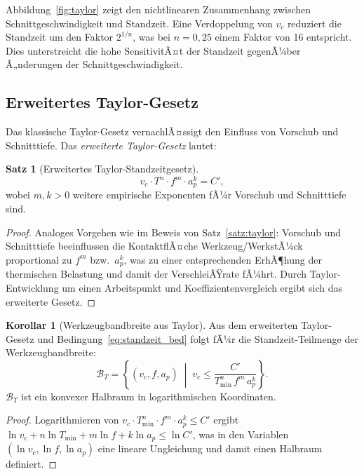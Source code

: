 ﻿\documentclass[a4paper,12pt]{article}
\theoremstyle{definition}
\newtheorem{satz}{Satz}
\newtheorem{korollar}{Korollar}
\begin{document}
Abbildung~\ref{fig:taylor} zeigt den nichtlinearen Zusammenhang zwischen
Schnittgeschwindigkeit und Standzeit. Eine Verdoppelung von $v_c$ reduziert die
Standzeit um den Faktor $2^{1/n}$, was bei $n = 0{,}25$ einem Faktor von 16
entspricht. Dies unterstreicht die hohe SensitivitÃ¤t der Standzeit gegenÃ¼ber
Ã„nderungen der Schnittgeschwindigkeit.

\subsection{Erweitertes Taylor-Gesetz}

Das klassische Taylor-Gesetz vernachlÃ¤ssigt den Einfluss von Vorschub und
Schnitttiefe. Das \emph{erweiterte Taylor-Gesetz} lautet:

\begin{satz}[Erweitertes Taylor-Standzeitgesetz]
\label{satz:taylor_erweitert}
  \[
    v_c \cdot T^n \cdot f^m \cdot a_p^k = C',
  \]
  wobei $m, k > 0$ weitere empirische Exponenten fÃ¼r Vorschub und Schnitttiefe sind.
\end{satz}

\begin{proof}
  Analoges Vorgehen wie im Beweis von Satz~\ref{satz:taylor}: Vorschub und
  Schnitttiefe beeinflussen die KontaktflÃ¤che Werkzeug/WerkstÃ¼ck proportional zu
  $f^{m}$ bzw.\ $a_p^{k}$, was zu einer entsprechenden ErhÃ¶hung der thermischen
  Belastung und damit der VerschleiÃŸrate fÃ¼hrt. Durch Taylor-Entwicklung um einen
  Arbeitspunkt und Koeffizientenvergleich ergibt sich das erweiterte Gesetz. \qedhere
\end{proof}

\begin{korollar}[Werkzeugbandbreite aus Taylor]
  Aus dem erweiterten Taylor-Gesetz und Bedingung~\eqref{eq:standzeit_bed} folgt
  fÃ¼r die Standzeit-Teilmenge der Werkzeugbandbreite:
  \[
    \mathcal{B}_T = \left\{(v_c, f, a_p) \;\middle|\; v_c \leq \frac{C'}{T_{\min}^n \, f^m \, a_p^k}\right\}.
  \]
  $\mathcal{B}_T$ ist ein konvexer Halbraum in logarithmischen Koordinaten.
\end{korollar}

\begin{proof}
  Logarithmieren von $v_c \cdot T_{\min}^n \cdot f^m \cdot a_p^k \leq C'$ ergibt
  $\ln v_c + n \ln T_{\min} + m \ln f + k \ln a_p \leq \ln C'$, was in den
  Variablen $(\ln v_c, \ln f, \ln a_p)$ eine lineare Ungleichung und damit einen
  Halbraum definiert. \qedhere
\end{proof}
\end{document}
